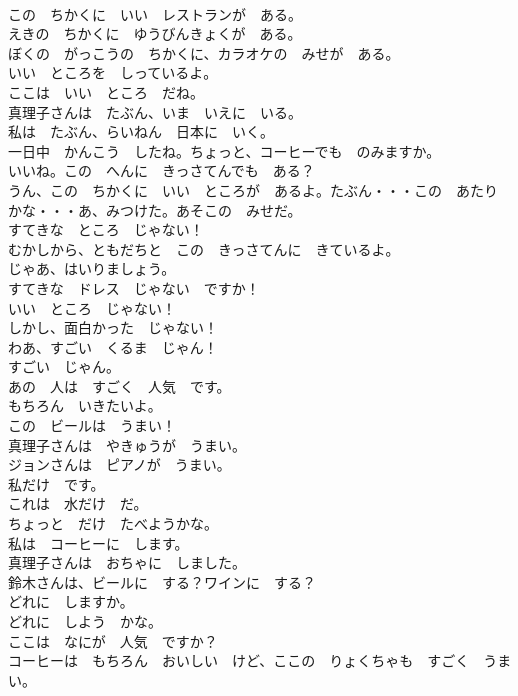 \documentclass[8pt]{extreport}
\begin{document}
\begin{CJK}{UTF8}{min}
\\	この　ちかくに　いい　レストランが　ある。	
\\	えきの　ちかくに　ゆうびんきょくが　ある。	
\\	ぼくの　がっこうの　ちかくに、カラオケの　みせが　ある。	
\\	いい　ところを　しっているよ。	
\\	ここは　いい　ところ　だね。	
\\	真理子さんは　たぶん、いま　いえに　いる。	
\\	私は　たぶん、らいねん　日本に　いく。	
\\	一日中　かんこう　したね。ちょっと、コーヒーでも　のみますか。	
\\	いいね。この　へんに　きっさてんでも　ある？	
\\	うん、この　ちかくに　いい　ところが　あるよ。たぶん・・・この　あたり　かな・・・あ、みつけた。あそこの　みせだ。	
\\	すてきな　ところ　じゃない！	
\\	むかしから、ともだちと　この　きっさてんに　きているよ。	
\\	じゃあ、はいりましょう。	
\\	すてきな　ドレス　じゃない　ですか！	
\\	いい　ところ　じゃない！	
\\	しかし、面白かった　じゃない！	
\\	わあ、すごい　くるま　じゃん！	
\\	すごい　じゃん。	
\\	あの　人は　すごく　人気　です。	
\\	もちろん　いきたいよ。	
\\	この　ビールは　うまい！	
\\	真理子さんは　やきゅうが　うまい。	
\\	ジョンさんは　ピアノが　うまい。	
\\	私だけ　です。	
\\	これは　水だけ　だ。	
\\	ちょっと　だけ　たべようかな。	
\\	私は　コーヒーに　します。	
\\	真理子さんは　おちゃに　しました。	
\\	鈴木さんは、ビールに　する？ワインに　する？	
\\	どれに　しますか。	
\\	どれに　しよう　かな。	
\\	ここは　なにが　人気　ですか？	
\\	コーヒーは　もちろん　おいしい　けど、ここの　りょくちゃも　すごく　うまい。	

\end{CJK}
\end{document}

